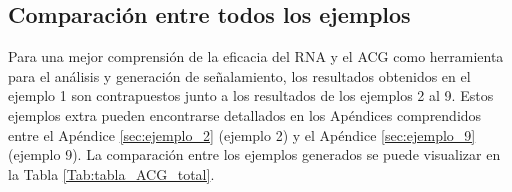 \subsection{Comparación entre todos los ejemplos}

	Para una mejor comprensión de la eficacia del RNA y el ACG como herramienta para el análisis y generación de señalamiento, los resultados obtenidos en el ejemplo 1 son contrapuestos junto a los resultados de los ejemplos 2 al 9. Estos ejemplos extra pueden encontrarse detallados en los Apéndices comprendidos entre el Apéndice \ref{sec:ejemplo_2} (ejemplo 2) y el Apéndice \ref{sec:ejemplo_9} (ejemplo 9). La comparación entre los ejemplos generados se puede visualizar en la Tabla \ref{Tab:tabla_ACG_total}.

	\begin{table}[H]
		{
			\caption{Comparación entre los ejemplos generados por el ACG.}
			\label{Tab:tabla_ACG_total}
			\centering
			\begin{center}
\end{center}}
\end{table}
